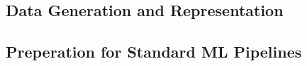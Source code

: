





\subsection{Data Generation and Representation}
\label{ml:approach:subsec1}


\subsection{Preperation for Standard ML Pipelines}
\label{ml:approach:subsec2}

